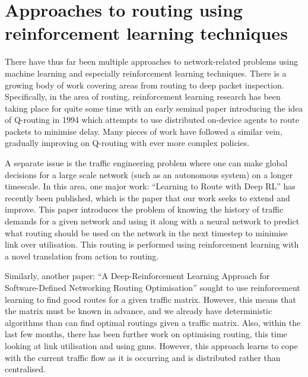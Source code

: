\section{Approaches to routing using reinforcement learning techniques}

There have thus far been multiple approaches to network-related problems using machine learning and especially reinforcement learning techniques\cite{luong2019applications}. There is a growing body of work covering areas from routing to deep packet inspection. Specifically, in the area of routing, reinforcement learning research has been taking place for quite some time with an early seminal paper introducing the idea of Q-routing in 1994\cite{boyan1994packet} which attempts to use distributed on-device agents to route packets to minimise delay. Many pieces of work have followed a similar vein, gradually improving on Q-routing with ever more complex policies\cite{you2019toward,Ali2019HierarchicalDD}.

A separate issue is the traffic engineering problem where one can make global decisions for a large scale network (such as an autonomous system) on a longer timescale. In this area, one major work: \enquote{Learning to Route with Deep RL}\cite{valadarsky2017learning} has recently been published, which is the paper that our work seeks to extend and improve. This paper introduces the problem of knowing the history of traffic demands for a given network and using it along with a neural network to predict what routing should be used on the network in the next timestep to minimise link over utilisation. This routing is performed using reinforcement learning with a novel translation from action to routing.

Similarly, another paper: \enquote{A Deep-Reinforcement Learning Approach for Software-Defined Networking Routing Optimisation}\cite{stampa2017deep} sought to use reinforcement learning to find good routes for a given traffic matrix. However, this means that the matrix must be known in advance, and we already have deterministic algorithms than can find optimal routings given a traffic matrix. Also, within the last few months, there has been further work on optimising routing, this time looking at link utilisation and using \acp{gnn}\cite{Sawada2020NetworkRO}. However, this approach learns to cope with the current traffic flow as it is occurring and is distributed rather than centralised.

